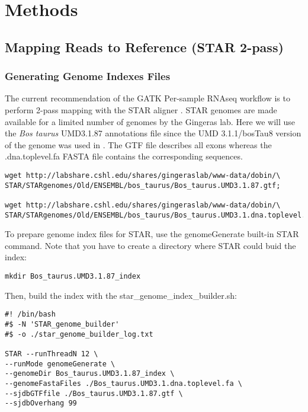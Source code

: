 

\section{Methods}



\subsection{Mapping Reads to Reference (STAR 2-pass)}



\subsubsection{Generating Genome Indexes Files}
The current recommendation of the GATK Per-sample RNAseq  workflow is to perform 2-pass mapping with the STAR aligner \cite{Dobin2013}. STAR genomes are made available for a limited number of genomes by the Gingeras lab. Here we will use the \textit{Bos taurus} UMD3.1.87 annotations file since the UMD 3.1.1/bosTau8 version of the genome was used in \citep{Ariel2021}. The GTF file describes all exons whereas the .dna.toplevel.fa FASTA file contains the corresponding sequences.

\begin{verbatim}
wget http://labshare.cshl.edu/shares/gingeraslab/www-data/dobin/\
STAR/STARgenomes/Old/ENSEMBL/bos_taurus/Bos_taurus.UMD3.1.87.gtf;

wget http://labshare.cshl.edu/shares/gingeraslab/www-data/dobin/\
STAR/STARgenomes/Old/ENSEMBL/bos_taurus/Bos_taurus.UMD3.1.dna.toplevel.fa;
\end{verbatim}

To prepare genome index files for STAR, use the genomeGenerate built-in STAR command.
Note that you have to create a directory where STAR could buid the index:

\begin{verbatim}
mkdir Bos_taurus.UMD3.1.87_index
\end{verbatim}

Then, build the index with the star\_genome\_index\_builder.sh:
\begin{verbatim}
#! /bin/bash
#$ -N 'STAR_genome_builder'
#$ -o ./star_genome_builder_log.txt

STAR --runThreadN 12 \
--runMode genomeGenerate \
--genomeDir Bos_taurus.UMD3.1.87_index \
--genomeFastaFiles ./Bos_taurus.UMD3.1.dna.toplevel.fa \
--sjdbGTFfile ./Bos_taurus.UMD3.1.87.gtf \
--sjdbOverhang 99
\end{verbatim}



